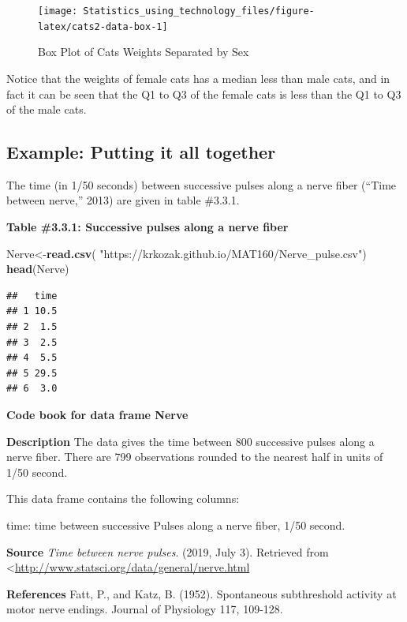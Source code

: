 \documentclass[
]{book}
\newenvironment{Shaded}{\begin{snugshade}}{\end{snugshade}}
\newcommand{\KeywordTok}[1]{\textcolor[rgb]{0.13,0.29,0.53}{\textbf{#1}}}
\newcommand{\NormalTok}[1]{#1}
\newcommand{\StringTok}[1]{\textcolor[rgb]{0.31,0.60,0.02}{#1}}
\begin{document}
\begin{figure}
\texttt{[image: Statistics\_using\_technology\_files/figure-latex/cats2-data-box-1]} \caption{Box Plot of Cats Weights Separated by Sex}\label{fig:cats2-data-box}
\end{figure}

Notice that the weights of female cats has a median less than male cats, and in fact it can be seen that the Q1 to Q3 of the female cats is less than the Q1 to Q3 of the male cats.

\hypertarget{example-putting-it-all-together}{%
\subsection{Example: Putting it all together}\label{example-putting-it-all-together}}

The time (in 1/50 seconds) between successive pulses along a nerve fiber (``Time between nerve,'' 2013) are given in table \#3.3.1.

\textbf{Table \#3.3.1: Successive pulses along a nerve fiber}

\begin{Shaded}
\begin{Highlighting}[]
\NormalTok{Nerve<-}\KeywordTok{read.csv}\NormalTok{(}
  \StringTok{"https://krkozak.github.io/MAT160/Nerve_pulse.csv"}\NormalTok{)}
\KeywordTok{head}\NormalTok{(Nerve)}
\end{Highlighting}
\end{Shaded}

\begin{verbatim}
##   time
## 1 10.5
## 2  1.5
## 3  2.5
## 4  5.5
## 5 29.5
## 6  3.0
\end{verbatim}

\textbf{Code book for data frame Nerve}

\textbf{Description}
The data gives the time between 800 successive pulses along a nerve fiber. There are 799 observations rounded to the nearest half in units of 1/50 second.

This data frame contains the following columns:

time: time between successive Pulses along a nerve fiber, 1/50 second.

\textbf{Source}
\emph{Time between nerve pulses}. (2019, July 3). Retrieved from
\textless{}\url{http://www.statsci.org/data/general/nerve.html}

\textbf{References}
Fatt, P., and Katz, B. (1952). Spontaneous subthreshold activity at motor nerve endings. Journal of Physiology 117, 109-128.
\end{document}
